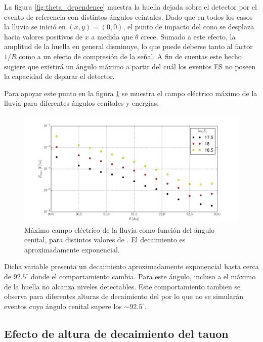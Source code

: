	La figura \ref{fig:theta_dependence} muestra la huella dejada sobre el detector por el evento de referencia con distintos \'angulos ceintales.
	Dado que en todos los casos la lluvia se inici\'o en $(x,y)=(0,0)$, el punto de impacto del cono \cher{} se desplaza hacia valores positivos de $x$ a medida que $\theta$ crece.
	Sumado a este efecto, la amplitud de la huella en general disminuye, lo que puede deberse tanto al factor $1/R$ como a un efecto de compresi\'on de la se\~nal.
	A fin de cuentas este hecho sugiere que existir\'a un \'angulo m\'aximo a partir del cu\'al los eventos ES no poseen la capacidad de dsparar el detector.
	
	Para apoyar este punto en la figura \ref{fig:theta_dependence2} se muestra el campo el\'ectrico m\'aximo de la lluvia para diferentes \'angulos cenitales y energ\'ias.
	\begin{figure}[ht!]
		\centering
		\includegraphics[width=\textwidth]{./fig/simulacionRadio/maxDep/eMaxTh}
		\caption{\label{fig:theta_dependence2}
		M\'aximo campo el\'ectrico de la lluvia como funci\'on del \'angulo cenital, para distintos valores de \ev{}. El decaimiento es aproximadamente exponencial.
		}
	\end{figure}
	Dicha variable presenta un decaimiento aproximadamente exponencial hasta cerca de $92.5^\circ$ donde el comportamiento cambia.
	Para este \'angulo, incluso a  el m\'aximo de la huella no alcanza niveles detectables.
	Este comportamiento tambien se observa para diferentes alturas de decaimiento del \tauon{} por lo que no se simular\'an eventos cuyo \'angulo cenital supere los $\sim92.5^\circ$.
	
	\subsection{Efecto de altura de decaimiento del tauon \xd{}}
	\label{sbsc:depXdRadio}
	
